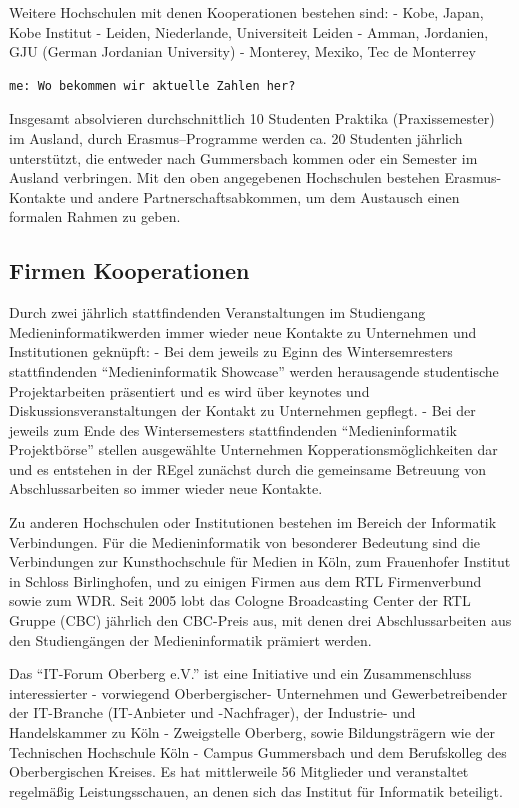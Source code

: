 Weitere Hochschulen mit denen Kooperationen bestehen sind: - Kobe,
Japan, Kobe Institut - Leiden, Niederlande, Universiteit Leiden - Amman,
Jordanien, GJU (German Jordanian University) - Monterey, Mexiko, Tec de
Monterrey

\begin{verbatim}
me: Wo bekommen wir aktuelle Zahlen her?
\end{verbatim}

Insgesamt absolvieren durchschnittlich 10 Studenten Praktika
(Praxissemester) im Ausland, durch Erasmus--Programme werden ca. 20
Studenten jährlich unterstützt, die entweder nach Gummersbach kommen
oder ein Semester im Ausland verbringen. Mit den oben angegebenen
Hochschulen bestehen Erasmus-Kontakte und andere Partnerschaftsabkommen,
um dem Austausch einen formalen Rahmen zu geben.

\subsection{Firmen Kooperationen}\label{firmen-kooperationen}

Durch zwei jährlich stattfindenden Veranstaltungen im Studiengang
Medieninformatikwerden immer wieder neue Kontakte zu Unternehmen und
Institutionen geknüpft: - Bei dem jeweils zu Eginn des Wintersemresters
stattfindenden ``Medieninformatik Showcase'' werden herausagende
studentische Projektarbeiten präsentiert und es wird über keynotes und
Diskussionsveranstaltungen der Kontakt zu Unternehmen gepflegt. - Bei
der jeweils zum Ende des Wintersemesters stattfindenden
``Medieninformatik Projektbörse'' stellen ausgewählte Unternehmen
Kopperationsmöglichkeiten dar und es entstehen in der REgel zunächst
durch die gemeinsame Betreuung von Abschlussarbeiten so immer wieder
neue Kontakte.

Zu anderen Hochschulen oder Institutionen bestehen im Bereich der
Informatik Verbindungen. Für die Medieninformatik von besonderer
Bedeutung sind die Verbindungen zur Kunsthochschule für Medien in Köln,
zum Frauenhofer Institut in Schloss Birlinghofen, und zu einigen Firmen
aus dem RTL Firmenverbund sowie zum WDR. Seit 2005 lobt das Cologne
Broadcasting Center der RTL Gruppe (CBC) jährlich den CBC-Preis aus, mit
denen drei Abschlussarbeiten aus den Studiengängen der Medieninformatik
prämiert werden.

Das ``IT-Forum Oberberg e.V.'' ist eine Initiative und ein
Zusammenschluss interessierter - vorwiegend Oberbergischer- Unternehmen
und Gewerbetreibender der IT-Branche (IT-Anbieter und -Nachfrager), der
Industrie- und Handelskammer zu Köln - Zweigstelle Oberberg, sowie
Bildungsträgern wie der Technischen Hochschule Köln - Campus Gummersbach
und dem Berufskolleg des Oberbergischen Kreises. Es hat mittlerweile 56
Mitglieder und veranstaltet regelmäßig Leistungsschauen, an denen sich
das Institut für Informatik beteiligt.

